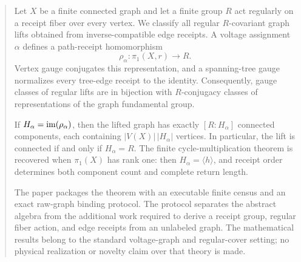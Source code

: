 \begin{abstract}
Let $X$ be a finite connected graph and let a finite group $R$ act regularly
on a receipt fiber over every vertex. We classify all regular $R$-covariant
graph lifts obtained from inverse-compatible edge receipts. A voltage
assignment $\alpha$ defines a path-receipt homomorphism
\[
\rho_{\alpha}:\pi_1(X,r)\longrightarrow R.
\]
Vertex gauge conjugates this representation, and a spanning-tree gauge
normalizes every tree-edge receipt to the identity. Consequently, gauge
classes of regular lifts are in bijection with $R$-conjugacy classes of
representations of the graph fundamental group.

If $H_{\alpha}=\im(\rho_{\alpha})$, then the lifted graph has exactly
$[R:H_{\alpha}]$ connected components, each containing
$|V(X)|\,|H_{\alpha}|$ vertices. In particular, the lift is connected if and
only if $H_{\alpha}=R$. The finite cycle-multiplication theorem is recovered
when $\pi_1(X)$ has rank one: then $H_{\alpha}=\langle h\rangle$, and receipt
order determines both component count and complete return length.

The paper packages the theorem with an executable finite census and an exact
raw-graph binding protocol. The protocol separates the abstract algebra from
the additional work required to derive a receipt group, regular fiber action,
and edge receipts from an unlabeled graph. The mathematical results belong to
the standard voltage-graph and regular-cover setting; no physical realization
or novelty claim over that theory is made.
\end{abstract}

